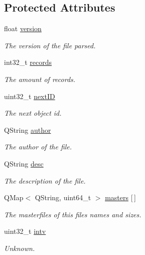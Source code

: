 \subsection*{Protected Attributes}
\begin{DoxyCompactItemize}
\item 
float \hyperlink{class_t_e_s4_form_ac43b3ea26b907f6a493377bd8bcaa433}{version}
\begin{DoxyCompactList}\small\item\em The version of the file parsed. \end{DoxyCompactList}\item 
int32\+\_\+t \hyperlink{class_t_e_s4_form_aa9442a2a6974797c0cbc80893eb1eb35}{records}
\begin{DoxyCompactList}\small\item\em The amount of records. \end{DoxyCompactList}\item 
uint32\+\_\+t \hyperlink{class_t_e_s4_form_ab88581c781ac52043756b241aaf81e0a}{next\+ID}
\begin{DoxyCompactList}\small\item\em The next object id. \end{DoxyCompactList}\item 
Q\+String \hyperlink{class_t_e_s4_form_adb8c90168e883d785ab821db06cef8cd}{author}
\begin{DoxyCompactList}\small\item\em The author of the file. \end{DoxyCompactList}\item 
Q\+String \hyperlink{class_t_e_s4_form_aa530f6d5b35d9ace03c4f8a0cd56d4ca}{desc}
\begin{DoxyCompactList}\small\item\em The description of the file. \end{DoxyCompactList}\item 
Q\+Map$<$ Q\+String, uint64\+\_\+t $>$ \hyperlink{class_t_e_s4_form_a4456691dfb90f6f6e7cd734fd6ac5ceb}{masters} \mbox{[}$\,$\mbox{]}
\begin{DoxyCompactList}\small\item\em The masterfiles of this file\textquotesingle{}s names and sizes. \end{DoxyCompactList}\item 
uint32\+\_\+t \hyperlink{class_t_e_s4_form_ab3ed4c6fda85359543c27f80bb118247}{intv}
\begin{DoxyCompactList}\small\item\em Unknown. \end{DoxyCompactList}\item 

\end{DoxyCompactItemize}
